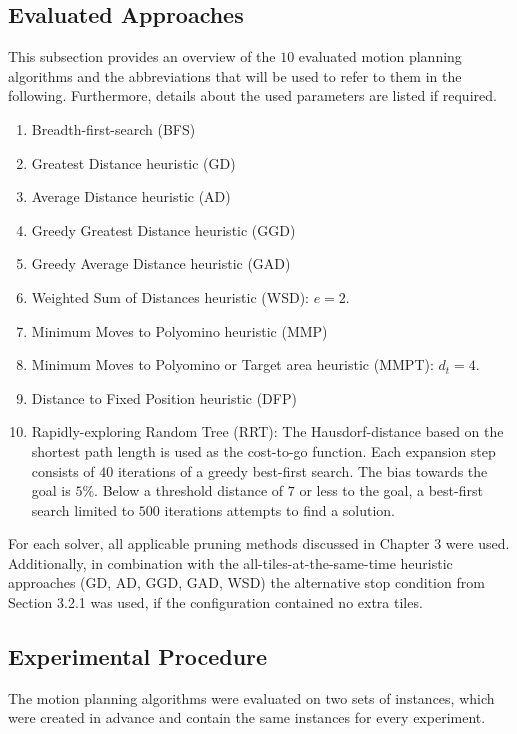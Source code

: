 \subsection{Evaluated Approaches}
This subsection provides an overview of the $10$ evaluated motion planning algorithms and the abbreviations that will be used to refer to them in the following. Furthermore, details about the used parameters are listed if required.
\begin{enumerate}
\setlength\itemsep{0.2em}
\item Breadth-first-search (BFS)
\item Greatest Distance heuristic (GD)
\item Average Distance heuristic (AD)
\item Greedy Greatest Distance heuristic (GGD)
\item Greedy Average Distance heuristic (GAD)
\item Weighted Sum of Distances heuristic (WSD): $e =2$.
\item Minimum Moves to Polyomino heuristic (MMP)
\item Minimum Moves to Polyomino or Target area heuristic (MMPT): $d_t = 4$.
\item Distance to Fixed Position heuristic (DFP)
\item Rapidly-exploring Random Tree (RRT): The Hausdorf-distance based on the shortest path length is used as the cost-to-go function. Each expansion step consists of $40$ iterations of a greedy best-first search. The bias towards the goal is $5$\%. Below a threshold distance of $7$ or less to the goal, a best-first search limited to $500$ iterations attempts to find a solution.
\end{enumerate}

For each solver, all applicable pruning methods discussed in Chapter 3 were used.
Additionally, in combination with the all-tiles-at-the-same-time heuristic approaches (GD, AD, GGD, GAD, WSD) the alternative stop condition from Section 3.2.1 was used, if the configuration contained no extra tiles.

\subsection{Experimental Procedure}
The motion planning algorithms were evaluated on two sets of instances, which were created in advance and contain the same instances for every experiment.

